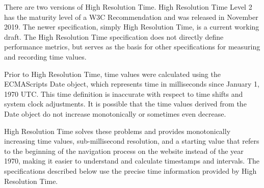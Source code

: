 There are two versions of High Resolution Time.
High Resolution Time Level 2 has the maturity level of a W3C Recommendation and was released in November 2019. %
The newer specification, simply High Resolution Time, is a current working draft. %
The High Resolution Time specification does not directly define performance metrics, but serves as the basis for other specifications for measuring and recording time values.


Prior to High Resolution Time, time values were calculated using the ECMAScripts Date object, which represents time in milliseconds since January 1, 1970 UTC. %
This time definition is inaccurate with respect to time shifts and system clock adjustments.
It is possible that the time values derived from the Date object do not increase monotonically or sometimes even decrease.

High Resolution Time solves these problems and provides monotonically increasing time values, sub-millisecond resolution, and a starting value that refers to the beginning of the navigation process on the website instead of the year 1970, making it easier to understand and calculate timestamps and intervals.
The specifications described below use the precise time information provided by High Resolution Time.






	


